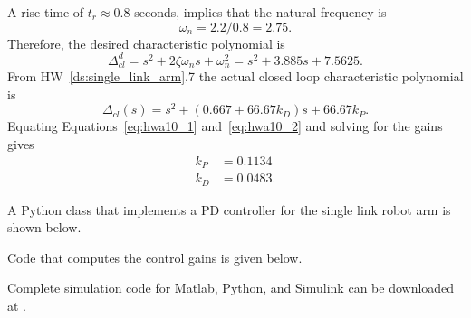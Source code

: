 A rise time of $t_r\approx 0.8$ seconds, implies that the natural frequency is
\[
\omega_n = 2.2/0.8 = 2.75.
\]
Therefore, the desired characteristic polynomial is
\begin{equation}\label{eq:hwa10_1}
\Delta_{cl}^d = s^2 + 2\zeta\omega_n s + \omega_n^2 = s^2 + 3.885 s + 7.5625.
\end{equation}
From HW~\ref{ds:single_link_arm}.7 the actual closed loop characteristic polynomial is
\begin{equation}\label{eq:hwa10_2}
\Delta_{cl}(s) = s^2 + (0.667 + 66.67k_D)s + 66.67k_P.
\end{equation}
Equating Equations~\eqref{eq:hwa10_1} and~\eqref{eq:hwa10_2} and solving for the gains gives
\begin{align*}
k_P &=  0.1134 \\
k_D &= 0.0483.
\end{align*}

A Python class that implements a PD controller for the single link robot arm is shown below.


Code that computes the control gains is given below.


Complete simulation code for Matlab, Python, and Simulink can be downloaded at .
